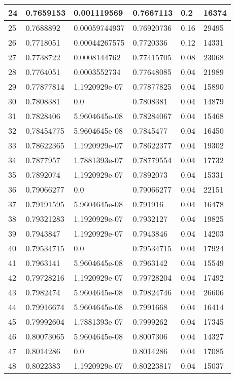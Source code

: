 \begin{longtable}{|l|l|l|l|l|l|}
24 & 0.7659153 & 0.001119569 & 0.7667113 & 0.2 & 16374 \\ \hline 
25 & 0.7688892 & 0.00059744937 & 0.76920736 & 0.16 & 29495 \\ \hline 
26 & 0.7718051 & 0.00044267575 & 0.7720336 & 0.12 & 14331 \\ \hline 
27 & 0.7738722 & 0.0008144762 & 0.77415705 & 0.08 & 23068 \\ \hline 
28 & 0.7764051 & 0.0003552734 & 0.77648085 & 0.04 & 21989 \\ \hline 
29 & 0.77877814 & 1.1920929e-07 & 0.77877825 & 0.04 & 15890 \\ \hline 
30 & 0.7808381 & 0.0 & 0.7808381 & 0.04 & 14879 \\ \hline 
31 & 0.7828406 & 5.9604645e-08 & 0.78284067 & 0.04 & 15468 \\ \hline 
32 & 0.78454775 & 5.9604645e-08 & 0.7845477 & 0.04 & 16450 \\ \hline 
33 & 0.78622365 & 1.1920929e-07 & 0.78622377 & 0.04 & 19302 \\ \hline 
34 & 0.7877957 & 1.7881393e-07 & 0.78779554 & 0.04 & 17732 \\ \hline 
35 & 0.7892074 & 1.1920929e-07 & 0.7892073 & 0.04 & 15331 \\ \hline 
36 & 0.79066277 & 0.0 & 0.79066277 & 0.04 & 22151 \\ \hline 
37 & 0.79191595 & 5.9604645e-08 & 0.791916 & 0.04 & 16478 \\ \hline 
38 & 0.79321283 & 1.1920929e-07 & 0.7932127 & 0.04 & 19825 \\ \hline 
39 & 0.7943847 & 1.1920929e-07 & 0.7943846 & 0.04 & 14203 \\ \hline 
40 & 0.79534715 & 0.0 & 0.79534715 & 0.04 & 17924 \\ \hline 
41 & 0.7963141 & 5.9604645e-08 & 0.7963142 & 0.04 & 15549 \\ \hline 
42 & 0.79728216 & 1.1920929e-07 & 0.79728204 & 0.04 & 17492 \\ \hline 
43 & 0.7982474 & 5.9604645e-08 & 0.79824746 & 0.04 & 26606 \\ \hline 
44 & 0.79916674 & 5.9604645e-08 & 0.7991668 & 0.04 & 16414 \\ \hline 
45 & 0.79992604 & 1.7881393e-07 & 0.7999262 & 0.04 & 17345 \\ \hline 
46 & 0.80073065 & 5.9604645e-08 & 0.8007306 & 0.04 & 14327 \\ \hline 
47 & 0.8014286 & 0.0 & 0.8014286 & 0.04 & 17085 \\ \hline 
48 & 0.8022383 & 1.1920929e-07 & 0.80223817 & 0.04 & 15037 \\ \hline 

\end{longtable}
